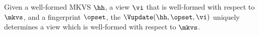 \begin{lemma}
Given a well-formed MKVS $\hh$, a view $\vi$ that is well-formed with respect to \( \mkvs \), and a fingerprint \( \opset \), the $\Vupdate(\hh, \opset, \vi)$ uniquely determines a view which is well-formed with respect to $\mkvs$.
\end{lemma}

                                                                                                         
